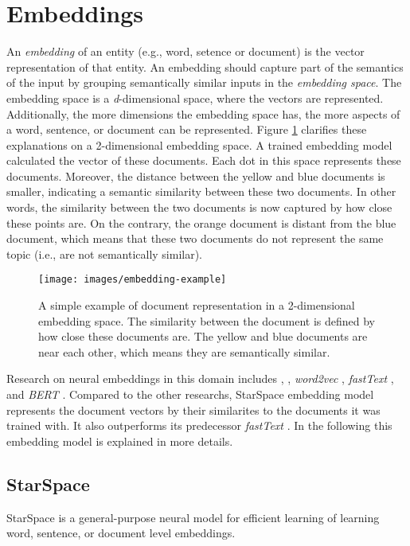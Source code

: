 \section{Embeddings}
\label{sec:embeddings}
An \emph{embedding} of an entity (e.g., word, setence or document) is the vector representation of that entity. An embedding should capture part of the semantics of the input by grouping semantically similar inputs in the \emph{embedding space}. The embedding space is a \emph{d}-dimensional space, where the vectors are represented. Additionally, the more dimensions the embedding space has, the more aspects of a word, sentence, or document can be represented. Figure \ref{fig:embedding-example} clarifies these explanations on a 2-dimensional embedding space. A trained embedding model calculated the vector of these documents. Each dot in this space represents these documents.
Moreover, the distance between the yellow and blue documents is smaller, indicating a semantic similarity between these two documents. In other words, the similarity between the two documents is now captured by how close these points are. On the contrary, the orange document is distant from the blue document, which means that these two documents do not represent the same topic (i.e., are not semantically similar).

\begin{figure}[!htb]
    \centering
    \texttt{[image: images/embedding-example]}
    \caption{A simple example of document representation in a 2-dimensional embedding space. The similarity between the document is defined by how close these documents are. The yellow and blue documents are near each other, which means they are semantically similar.}
    \label{fig:embedding-example}
\end{figure}


Research on neural embeddings in this domain includes \cite{bengioNeuralProbabilisticLanguage2003}, 
\cite{collobertNaturalLanguageProcessing2011}, \emph{word2vec} \cite{mikolovEfficientEstimationWord2013}, \emph{fastText} \cite{joulinFastTextZipCompressing2016}, and \emph{BERT} \cite{devlinBERTPretrainingDeep2019}. Compared to the other researchs, StarSpace embedding model represents the document vectors by their similarites to the documents it was trained with. It also outperforms its predecessor \emph{fastText} \cite{wuStarSpaceEmbedAll2017}. In the following this embedding model is explained in more details.

\subsection{StarSpace}
\label{subsec:StarSpace}
StarSpace \cite{wuStarSpaceEmbedAll2017} is a general-purpose neural model for efficient learning of learning word, sentence, or document level embeddings.


